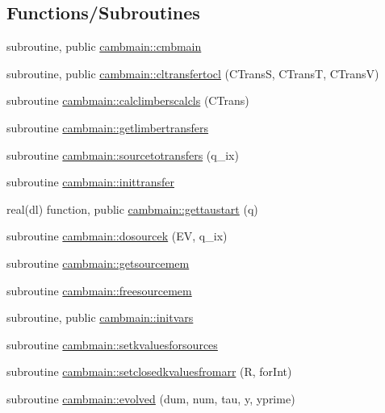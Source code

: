 \subsection*{Functions/\+Subroutines}
\begin{DoxyCompactItemize}
\item 
subroutine, public \mbox{\hyperlink{namespacecambmain_a8863977991a108f96a26fc99e8c5e129}{cambmain\+::cmbmain}}
\item 
subroutine, public \mbox{\hyperlink{namespacecambmain_a15c0f01f07762c709f8f718935153d7a}{cambmain\+::cltransfertocl}} (C\+TransS, C\+TransT, C\+TransV)
\item 
subroutine \mbox{\hyperlink{namespacecambmain_ad3f7f4af84395bc4648bcc82e81e8861}{cambmain\+::calclimberscalcls}} (C\+Trans)
\item 
subroutine \mbox{\hyperlink{namespacecambmain_ae71666c61f08659e1870539ab6230f02}{cambmain\+::getlimbertransfers}}
\item 
subroutine \mbox{\hyperlink{namespacecambmain_ad84747dc28d2ff66a818a46c3eb5f574}{cambmain\+::sourcetotransfers}} (q\+\_\+ix)
\item 
subroutine \mbox{\hyperlink{namespacecambmain_a556b6e83160b14e40cffab6e0deb6e12}{cambmain\+::inittransfer}}
\item 
real(dl) function, public \mbox{\hyperlink{namespacecambmain_affb3c10eee60a6f657ccf1c0f0abd693}{cambmain\+::gettaustart}} (q)
\item 
subroutine \mbox{\hyperlink{namespacecambmain_a9ff2ea693941648b6f34d86e019f9613}{cambmain\+::dosourcek}} (EV, q\+\_\+ix)
\item 
subroutine \mbox{\hyperlink{namespacecambmain_af7f170a39e21214fe3b389f74dbb183d}{cambmain\+::getsourcemem}}
\item 
subroutine \mbox{\hyperlink{namespacecambmain_a47cd48fe0174b214ddc23bcdd91b6754}{cambmain\+::freesourcemem}}
\item 
subroutine, public \mbox{\hyperlink{namespacecambmain_a890ea024560967d80a83e411a34368ed}{cambmain\+::initvars}}
\item 
subroutine \mbox{\hyperlink{namespacecambmain_a63fe5ba29fa3c5116ef8bc646e7aa09c}{cambmain\+::setkvaluesforsources}}
\item 
subroutine \mbox{\hyperlink{namespacecambmain_a96c41c9fdee3e69fba450a460df25472}{cambmain\+::setclosedkvaluesfromarr}} (R, for\+Int)
\item 
subroutine \mbox{\hyperlink{namespacecambmain_a8861dfd3252de9c7b39b9c09ee415010}{cambmain\+::evolved}} (dum, num, tau, y, yprime)

\end{DoxyCompactItemize}
